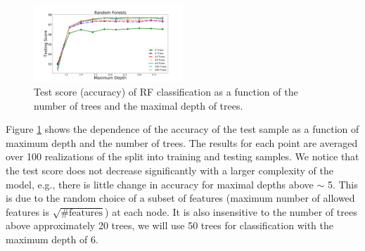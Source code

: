 \begin{figure}[h]
\hspace*{-0.5cm}
\includegraphics[width=0.5\textwidth]{plots/rf_train_unweighted}
\caption{
Test score (accuracy) of RF classification as a function of the number of trees and 
the maximal depth of trees.
}
\label{fig:RF_complexity}
\end{figure}

Figure \ref{fig:RF_complexity} shows the dependence of the accuracy of the test sample as a function of maximum depth and the number of trees. 
The results for each point are averaged over 100 realizations of the split into training and testing samples.
We notice that the test score does not decrease significantly with a larger complexity of the model, e.g., there is little change in accuracy for maximal depths above $\sim$ 5.
This is due to the random choice of a subset of features (maximum number of allowed features is $\sqrt{\text{\# features}}$) at each node.
It is also insensitive to the number of trees above approximately 20 trees, we will use 50 trees for classification with the maximum depth of 6.

